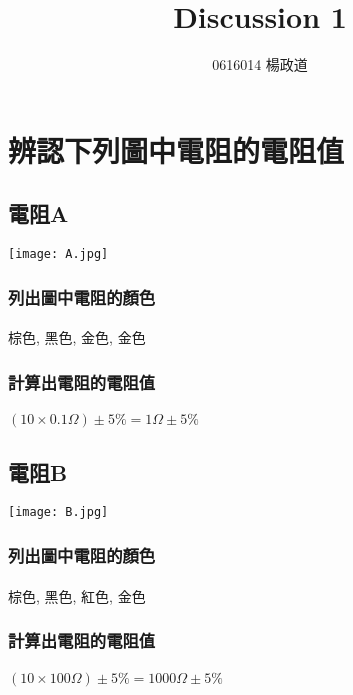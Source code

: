 \title{Discussion 1}
\author{0616014 楊政道}
\maketitle
\thispagestyle{fancy}
\section{辨認下列圖中電阻的電阻值}
\subsection{電阻A}
\begin{center} 
\texttt{[image: A.jpg]} 
\end{center} 
\subsubsection{列出圖中電阻的顏色}
\paragraph{}
棕色, 黑色, 金色, 金色
\subsubsection{計算出電阻的電阻值}
\paragraph{}
$(10 \times 0.1\Omega) \pm 5\% = 1\Omega \pm 5\%$

\subsection{電阻B}
\begin{center} 
\texttt{[image: B.jpg]} 
\end{center} 
\subsubsection{列出圖中電阻的顏色}
\paragraph{}
棕色, 黑色, 紅色, 金色
\subsubsection{計算出電阻的電阻值}
\paragraph{}
$(10 \times 100\Omega) \pm 5\% = 1000\Omega \pm 5\%$

